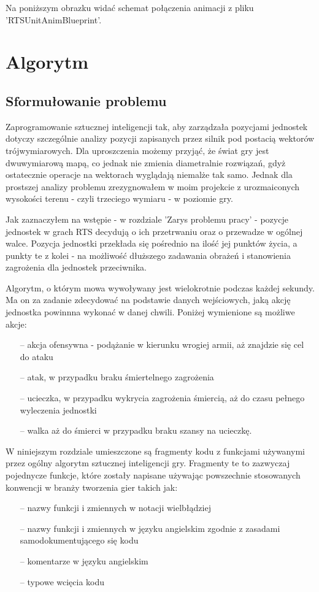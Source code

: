 \documentclass[12pt]{report}
\begin{document}
Na poniższym obrazku widać schemat połączenia animacji z pliku 'RTSUnitAnimBlueprint'.


\chapter{Algorytm}
\section{Sformułowanie problemu}
Zaprogramowanie sztucznej inteligencji tak, aby zarządzała pozycjami jednostek dotyczy szczególnie analizy pozycji zapisanych przez silnik pod postacią wektorów trójwymiarowych. Dla uproszczenia możemy przyjąć, że świat gry jest dwuwymiarową mapą, co jednak nie zmienia diametralnie rozwiązań, gdyż ostatecznie operacje na wektorach wyglądają niemalże tak samo. Jednak dla prostszej analizy problemu zrezygnowałem w moim projekcie z urozmaiconych wysokości terenu - czyli trzeciego wymiaru - w poziomie gry.

Jak zaznaczyłem na wstępie - w rozdziale 'Zarys problemu pracy' - pozycje jednostek w grach RTS decydują o ich przetrwaniu oraz o przewadze w ogólnej walce. Pozycja jednostki przekłada się pośrednio na ilość jej punktów życia, a punkty te z kolei - na możliwość dłuższego zadawania obrażeń i stanowienia zagrożenia dla jednostek przeciwnika.

Algorytm, o którym mowa wywoływany jest wielokrotnie podczas każdej sekundy. Ma on za zadanie zdecydować na podstawie danych wejściowych, jaką akcję jednostka powinnna wykonać w danej chwili. Poniżej wymienione są możliwe akcje:
\begin{itemize}
\item[--] akcja ofensywna - podążanie w kierunku wrogiej armii, aż znajdzie się cel do ataku
\item[--] atak, w przypadku braku śmiertelnego zagrożenia
\item[--] ucieczka, w przypadku wykrycia zagrożenia śmiercią, aż do czasu pełnego wyleczenia jednostki
\item[--] walka aż do śmierci w przypadku braku szansy na ucieczkę.
\end{itemize}

W niniejszym rozdziale umieszczone są fragmenty kodu z funkcjami używanymi przez ogólny algorytm sztucznej inteligencji gry. Fragmenty te to zazwyczaj pojednycze funkcje, które zostały napisane używając powszechnie stosowanych konwencji w branży tworzenia gier takich jak:
\begin{itemize}
\item[--] nazwy funkcji i zmiennych w notacji wielbłądziej
\item[--] nazwy funkcji i zmiennych w języku angielskim zgodnie z zasadami samodokumentującego się kodu
\item[--] komentarze w języku angielskim
\item[--] typowe wcięcia kodu
\end{itemize}
\end{document}
